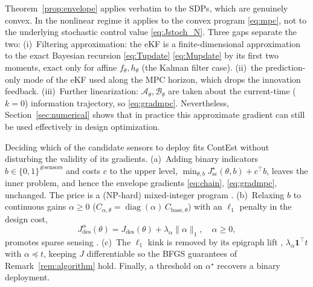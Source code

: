\documentclass[twocolumn,amsthm]{autart}
\begin{document}
\begin{rem}\label{rem:ekfbreaks}
Theorem~\ref{prop:envelope} applies verbatim to the SDPs, which are genuinely
convex. In the nonlinear regime it applies to the convex program \eqref{eq:mpc},
not to the underlying stochastic control value \eqref{eq:Jstoch_N}. Three gaps
separate the two: (i)~Filtering
approximation: the eKF is a finite-dimensional approximation to the exact Bayesian recursion
\eqref{eq:Tupdate} \eqref{eq:Mupdate} by its first two moments, exact only for
affine $f_\theta,h_\theta$ \cite{anderson2012optimal} (the Kalman filter case).
(ii)~the prediction-only mode of the eKF used along the MPC horizon, which drops the innovation feedback. (iii)~Further linearization: $\mathcal A_\theta,
\mathcal B_\theta$ are taken about the current-time ($k=0$) information trajectory, so
\eqref{eq:gradmpc}. Nevertheless, Section~\ref{sec:numerical} shows that in practice this approximate gradient can still be used effectively in design optimization.
\end{rem}

\begin{rem}\label{rem:sensor}
Deciding which of the candidate sensors to deploy fits ContEst without
disturbing the validity of its gradients. (a)~Adding binary indicators $b\in\{0,1\}^{\#\text{sensors}}$ and
costs $c$ to the upper level, $\min_{\theta,b}
J_{\mathrm{sc}}^\star(\theta,b)+c^\top b$, leaves the inner problem, and hence the
envelope gradients \eqref{eq:chain}, \eqref{eq:gradmpc}, unchanged. The price is a
(NP-hard) mixed-integer program \cite{joshi2009sensor,tzoumas2016sensor}.
(b)~Relaxing $b$ to continuous gains $\alpha\ge0$ ($C_{\alpha,\theta}=\operatorname{diag}(\alpha)\,C_{\mathrm{base},\theta}$) with an $\ell_1$ penalty in the design cost,
\begin{equation}\label{eq:Jdes}
J_{\mathrm{des}}^\alpha(\theta) = J_{\mathrm{des}}(\theta) + \lambda_\alpha \| \alpha \|_1,
\quad \alpha \ge 0,
\end{equation}
promotes sparse sensing \cite{dhingra2014admm,saraf2017h2,das2017sparse}. (c)~The $\ell_1$ kink is removed
by its epigraph lift \cite{boyd2004convex}, $\lambda_\alpha \mathbf 1^\top t$ with
$\alpha\preceq t$, keeping $J$ differentiable so the BFGS guarantees of
Remark~\ref{rem:algorithm} hold. Finally, a threshold on $\alpha^\star$ recovers a binary
deployment.
\end{rem}
\end{document}
